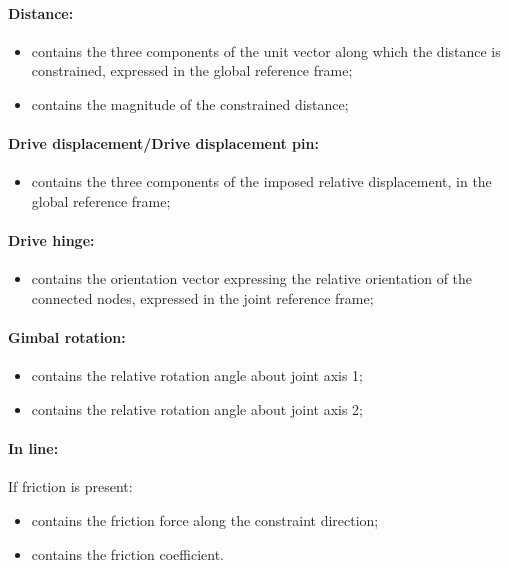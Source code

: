 \paragraph{Distance:}
\begin{itemize}
\item {} contains the three components
  of the unit vector along which the distance is constrained, 
  expressed in the global reference frame;
\item {} contains the magnitude of the
  constrained distance;
\end{itemize}

\paragraph{Drive displacement/Drive displacement pin:}
\begin{itemize}
\item {} contains the three components
  of the imposed relative displacement, in the global reference frame;
\end{itemize}

\paragraph{Drive hinge:}
\begin{itemize}
\item {} contains the orientation vector
  expressing the relative orientation of the connected nodes, expressed in 
  the joint reference frame;
\end{itemize}

\paragraph{Gimbal rotation:}
\begin{itemize}
\item {} contains the relative rotation
  angle about joint axis 1;
\item {} contains the relative rotation
  angle about joint axis 2;
\end{itemize}

\paragraph{In line:}
If friction is present:
\begin{itemize}
\item {} contains the friction force along
  the constraint direction;
\item {} contains the friction coefficient.
\end{itemize}

